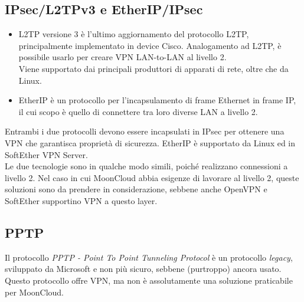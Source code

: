 	      
	      
	      \subsection{IPsec/L2TPv3 e EtherIP/IPsec}
	      \begin{itemize}
	      	\item L2TP versione 3 è l'ultimo aggiornamento del protocollo L2TP, principalmente implementato in
	      	      device Cisco. Analogamento ad L2TP, è possibile usarlo per creare VPN LAN-to-LAN al livello 2.\\
	      	      Viene supportato dai principali produttori di apparati di rete, oltre che da Linux.
	      	\item EtherIP è un protocollo per l'incapsulamento di frame Ethernet in frame IP, il cui scopo è quello
	      	      di connettere tra loro diverse LAN a livello 2.
	      \end{itemize}
	      Entrambi i due protocolli devono essere incapsulati in IPsec per ottenere una VPN che garantisca proprietà
	      di sicurezza.
	      EtherIP è
	      supportato da Linux ed in SoftEther VPN Server.\\
	      Le due tecnologie sono in qualche modo simili, poiché realizzano connessioni a livello 2. Nel caso in cui
	      MoonCloud abbia esigenze di lavorare al livello 2, queste soluzioni sono da prendere in considerazione, sebbene
	      anche OpenVPN e SoftEther supportino VPN a questo layer.
	      
	      
	      \subsection{PPTP}
	      Il protocollo \textit{PPTP - Point To Point Tunneling Protocol} è un protocollo
	      \textit{legacy}, sviluppato da Microsoft e non più sicuro, sebbene (purtroppo)
	      ancora usato.
	      Questo protocollo offre VPN, ma non è assolutamente una soluzione praticabile per
	      MoonCloud.
